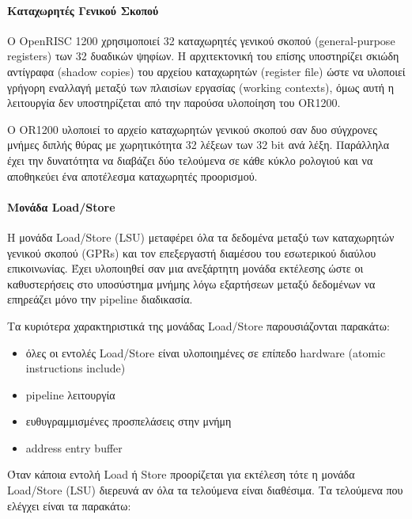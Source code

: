 \documentclass[a4paper,10pt]{article}
\numberwithin{figure}{section}
\numberwithin{table}{section}
\begin{document}
\paragraph{Καταχωρητές Γενικού Σκοπού\newline\newline}

Ο OpenRISC 1200 χρησιμοποιεί 32 καταχωρητές γενικού σκοπού (general-purpose registers) των 32 δυαδικών ψηφίων. Η αρχιτεκτονική του επίσης υποστηρίζει σκιώδη αντίγραφα (shadow copies) του αρχείου καταχωρητών (register file)
ώστε να υλοποιεί γρήγορη εναλλαγή μεταξύ των πλαισίων εργασίας (working contexts), όμως
αυτή η λειτουργία δεν υποστηρίζεται από την παρούσα υλοποίηση του OR1200.
\newline

Ο OR1200 υλοποιεί το αρχείο καταχωρητών γενικού σκοπού σαν δυο σύγχρονες μνήμες διπλής θύρας
με χωρητικότητα 32 λέξεων των 32 bit  ανά λέξη. Παράλληλα έχει την δυνατότητα να διαβάζει
δύο τελούμενα σε κάθε κύκλο ρολογιού και να αποθηκεύει ένα αποτέλεσμα καταχωρητές προορισμού.
\newpage
\paragraph{Μονάδα Load/Store\newline\newline}

Η μονάδα Load/Store (LSU) μεταφέρει όλα τα δεδομένα μεταξύ των καταχωρητών γενικού σκοπού (GPRs) και τον
επεξεργαστή διαμέσου του εσωτερικού διαύλου επικοινωνίας. Έχει υλοποιηθεί σαν μια ανεξάρτητη μονάδα
εκτέλεσης ώστε οι καθυστερήσεις στο υποσύστημα μνήμης λόγω εξαρτήσεων μεταξύ δεδομένων να
επηρεάζει μόνο την pipeline διαδικασία.
\newline

Τα κυριότερα χαρακτηριστικά της μονάδας Load/Store παρουσιάζονται παρακάτω:


\begin{itemize}
 \item όλες οι εντολές Load/Store είναι υλοποιημένες σε επίπεδο hardware (atomic instructions include)
 \item pipeline λειτουργία
 \item ευθυγραμμισμένες προσπελάσεις στην μνήμη
 \item address entry buffer
\end{itemize}

Όταν κάποια εντολή Load ή Store προορίζεται για εκτέλεση τότε η μονάδα Load/Store (LSU)
διερευνά αν όλα τα τελούμενα είναι διαθέσιμα. Τα τελούμενα που ελέγχει είναι τα παρακάτω:
\end{document}
